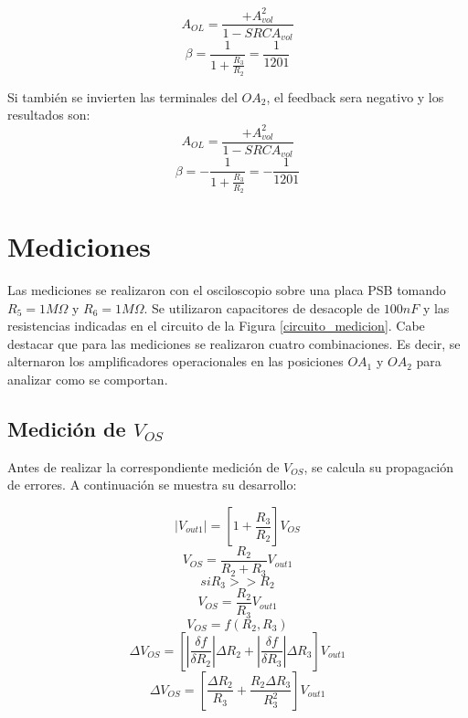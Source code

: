 \begin{displaymath}  A_{OL}= \frac{+A_{vol}^2}{1-SRC A_{vol}}  \end{displaymath}
\begin{displaymath}  \beta =  \frac{1}{1+ \frac{R_3}{R_2}} = \frac{1}{1201}  \end{displaymath}

Si también se invierten las terminales del $OA_2$, el feedback sera negativo y los resultados son:
\begin{displaymath}  A_{OL}= \frac{+A_{vol}^2}{1-SRC A_{vol}}  \end{displaymath}
\begin{displaymath}  \beta =  -\frac{1}{1+ \frac{R_3}{R_2}} = -\frac{1}{1201}  \end{displaymath}

\section{Mediciones}
Las mediciones se realizaron con el osciloscopio sobre una placa PSB tomando $R_5 = 1M\Omega$ y $R_6 = 1M\Omega$. Se utilizaron capacitores de desacople de $100nF$ y las resistencias indicadas en el circuito de la Figura \ref{circuito_medicion}.
Cabe destacar que para las mediciones se realizaron cuatro combinaciones. Es decir, se alternaron los amplificadores operacionales en las posiciones $OA_1$ y $OA_2$ para analizar como se comportan. 


\subsection{Medición de $V_{OS}$}

Antes de realizar la correspondiente medición de $V_{OS}$, se calcula su propagación de errores.  A continuación se muestra su desarrollo:

\begin{displaymath} |V_{out1}| = [1 + \frac{R_3}{R_2}]V_{OS} \end{displaymath}
\begin{displaymath} V_{OS} = \frac{R_2}{R_2 + R_3} V_{out1} \end{displaymath}
\begin{displaymath} si R_3 >> R_2 \end{displaymath}  
\begin{displaymath} V_{OS} = \frac{R_2}{R_3} V_{out1} \end{displaymath} 
\begin{displaymath} V_{OS} = f(R_2,R_3) \end{displaymath} 
\begin{displaymath} \Delta V_{OS} = [|\frac{\delta f}{\delta R_2}| \Delta R_2 + |\frac{\delta f}{\delta R_3}| \Delta R_3 ] V_{out1} \end{displaymath} 
\begin{displaymath} \Delta V_{OS} = [\frac {\Delta R_2} { R_3} + \frac{R_2 \Delta R_3 }{R_3^2}] V_{out1} \end{displaymath} 

